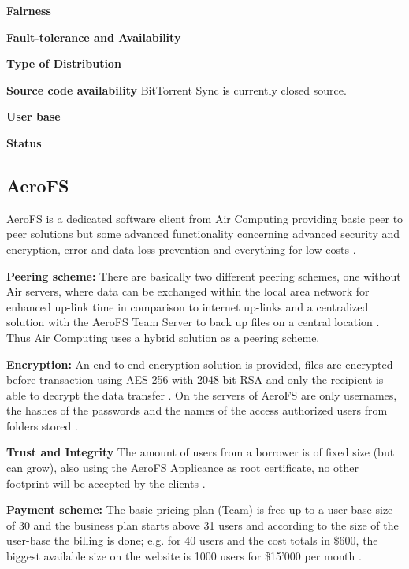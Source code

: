 \textbf{Fairness}

\textbf{Fault-tolerance and Availability}

\textbf{Type of Distribution}

\textbf{Source code availability}
BitTorrent Sync is currently closed source.

\textbf{User base}

\textbf{Status}

\subsection{AeroFS} %
AeroFS is a dedicated software client from Air Computing providing basic peer to peer solutions but some advanced functionality concerning advanced security and encryption, error and data loss prevention and everything for low costs \cite{aerofs}.

\textbf{Peering scheme:} There are basically two different peering schemes, one without Air servers, where data can be exchanged within the local area network for enhanced up-link time in comparison to internet up-links \cite{aerofs:peering_scheme} and a centralized solution with the AeroFS Team Server to back up files on a central location \cite{aerofs:peering_scheme_2}. Thus Air Computing uses a hybrid solution as a peering scheme.

\textbf{Encryption:} An end-to-end encryption solution is provided, files are encrypted before transaction using AES-256 with 2048-bit RSA and only the recipient is able to decrypt the data transfer \cite{aerofs:security}. On the servers of AeroFS are only usernames, the hashes of the passwords and the names of the access authorized users from folders stored \cite{aerofs:security_2}.

\textbf{Trust and Integrity} The amount of users from a borrower is of fixed size (but can grow), also using the AeroFS Applicance as root certificate, no other footprint will be accepted by the clients \cite{aerofs:security}.

\textbf{Payment scheme:} The basic pricing plan (Team) is free up to a user-base size of 30 \cite{aerofs:blog:30_users_free} and the business plan starts above 31 users and according to the size of the user-base the billing is done; e.g. for 40 users and the cost totals in \$600, the biggest available size on the website is 1000 users for \$15'000 per month \cite{aerofs:pricing}.

